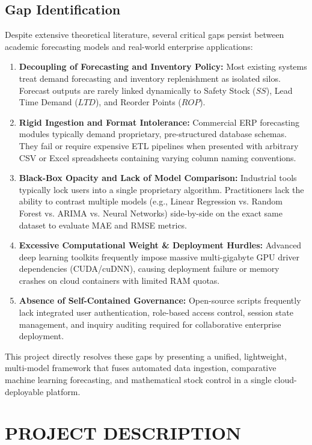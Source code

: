 \documentclass[12pt,a4paper]{report}
\begin{document}
\section{Gap Identification}
Despite extensive theoretical literature, several critical gaps persist between academic forecasting models and real-world enterprise applications:
\begin{enumerate}
    \item \textbf{Decoupling of Forecasting and Inventory Policy:} Most existing systems treat demand forecasting and inventory replenishment as isolated silos. Forecast outputs are rarely linked dynamically to Safety Stock ($SS$), Lead Time Demand ($LTD$), and Reorder Points ($ROP$).
    \item \textbf{Rigid Ingestion and Format Intolerance:} Commercial ERP forecasting modules typically demand proprietary, pre-structured database schemas. They fail or require expensive ETL pipelines when presented with arbitrary CSV or Excel spreadsheets containing varying column naming conventions.
    \item \textbf{Black-Box Opacity and Lack of Model Comparison:} Industrial tools typically lock users into a single proprietary algorithm. Practitioners lack the ability to contrast multiple models (e.g., Linear Regression vs. Random Forest vs. ARIMA vs. Neural Networks) side-by-side on the exact same dataset to evaluate MAE and RMSE metrics.
    \item \textbf{Excessive Computational Weight \& Deployment Hurdles:} Advanced deep learning toolkits frequently impose massive multi-gigabyte GPU driver dependencies (CUDA/cuDNN), causing deployment failure or memory crashes on cloud containers with limited RAM quotas.
    \item \textbf{Absence of Self-Contained Governance:} Open-source scripts frequently lack integrated user authentication, role-based access control, session state management, and inquiry auditing required for collaborative enterprise deployment.
\end{enumerate}

This project directly resolves these gaps by presenting a unified, lightweight, multi-model framework that fuses automated data ingestion, comparative machine learning forecasting, and mathematical stock control in a single cloud-deployable platform.

\newpage
\chapter{PROJECT DESCRIPTION}
\end{document}
